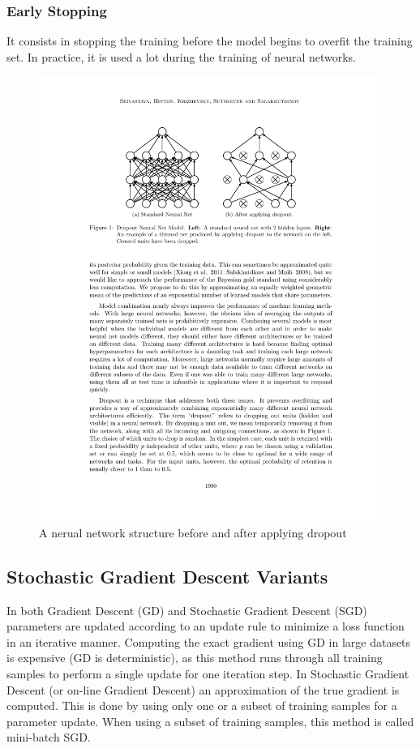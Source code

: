     \subsubsection{Early Stopping}
    It consists in stopping the training before the model begins to overfit the training set.  In practice, it is used a lot during the training of neural networks.

    \begin{figure}[!h]
        \centering
        \includegraphics[scale=0.7]{Figures/dropout.pdf}
        \caption{A nerual network structure before and after applying dropout}
        \label{dropout}
    \end{figure}

    \subsection{Stochastic Gradient Descent Variants}
    \label{sgd}
    In both Gradient Descent (GD) and Stochastic Gradient Descent (SGD) parameters are updated according to an update rule to minimize a loss function in an iterative manner. Computing the exact gradient using GD in large datasets is expensive (GD is deterministic), as this method runs through all training samples to perform a single update for one iteration step. In Stochastic Gradient Descent (or on-line Gradient Descent) an approximation of the true gradient is computed. This is done by using only one or a subset of training samples for a parameter update. When using a subset of training samples, this method is called mini-batch SGD. \\

